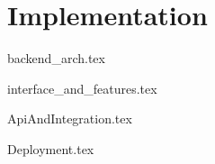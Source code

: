 \chapter{Implementation}


{backend_arch.tex}

{interface_and_features.tex}

{ApiAndIntegration.tex}

{Deployment.tex}
